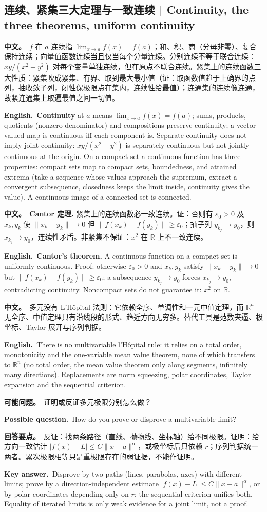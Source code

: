 \documentclass[UTF8,11pt,a4paper]{ctexart}
\newcommand{\R}{\mathbb{R}}
\newcommand{\BOTH}[2]{\par\noindent\textbf{中文。}\ #1\par\noindent\textbf{English.}\ #2\par}
\newcommand{\ASK}[4]{\begin{samepage}\par\noindent\textbf{可能问题。}\ #1\par\noindent\textbf{Possible question.}\ #2\par\noindent\textbf{回答要点。}\ #3\par\noindent\textbf{Key answer.}\ #4\medskip\end{samepage}}
\begin{document}
\subsection{连续、紧集三大定理与一致连续 | Continuity, the three theorems, uniform continuity}
\BOTH{$f$ 在 $a$ 连续指 $\lim_{x\to a}f(x)=f(a)$；和、积、商（分母非零）、复合保持连续；向量值函数连续当且仅当每个分量连续。分别连续不等于联合连续：$xy/(x^2+y^2)$ 对每个变量单独连续，但在原点不联合连续。紧集上的连续函数三大性质：紧集映成紧集、有界、取到最大最小值（证：取函数值趋于上确界的点列，抽收敛子列，闭性保极限点在集内，连续性给最值）；连通集的连续像连通，故紧连通集上取遍最值之间一切值。}{\textbf{Continuity} at $a$ means $\lim_{x\to a}f(x)=f(a)$; sums, products, quotients (nonzero denominator) and compositions preserve continuity; a vector-valued map is continuous iff each component is. Separate continuity does not imply joint continuity: $xy/(x^2+y^2)$ is separately continuous but not jointly continuous at the origin. On a compact set a continuous function has three properties: compact sets map to compact sets, boundedness, and attained extrema (take a sequence whose values approach the supremum, extract a convergent subsequence, closedness keeps the limit inside, continuity gives the value). A continuous image of a connected set is connected.}
\BOTH{\textbf{Cantor 定理.} 紧集上的连续函数必一致连续。证：否则有 $\varepsilon_0>0$ 及 $x_k,y_k$ 使 $\|x_k-y_k\|\to0$ 但 $\|f(x_k)-f(y_k)\|\ge\varepsilon_0$；抽子列 $y_{k_j}\to y_0$，则 $x_{k_j}\to y_0$，连续性矛盾。非紧集不保证：$x^2$ 在 $\R$ 上不一致连续。}{\textbf{Cantor's theorem.} A continuous function on a compact set is uniformly continuous. Proof: otherwise $\varepsilon_0>0$ and $x_k,y_k$ satisfy $\|x_k-y_k\|\to0$ but $\|f(x_k)-f(y_k)\|\ge\varepsilon_0$; a subsequence $y_{k_j}\to y_0$ forces $x_{k_j}\to y_0$, contradicting continuity. Noncompact sets do not guarantee it: $x^2$ on $\R$.}
\BOTH{多元没有 L'H\^opital 法则：它依赖全序、单调性和一元中值定理，而 $\R^n$ 无全序、中值定理只有沿线段的形式、趋近方向无穷多。替代工具是范数夹逼、极坐标、Taylor 展开与序列判据。}{There is no multivariable l'H\^opital rule: it relies on a total order, monotonicity and the one-variable mean value theorem, none of which transfers to $\R^n$ (no total order, the mean value theorem only along segments, infinitely many directions). Replacements are norm squeezing, polar coordinates, Taylor expansion and the sequential criterion.}
\ASK{证明或反证多元极限分别怎么做？}{How do you prove or disprove a multivariable limit?}{反证：找两条路径（直线、抛物线、坐标轴）给不同极限。证明：给方向一致估计 $|f(x)-L|\le C\|x-a\|^\alpha$，或极坐标后只依赖 $r$；序列判据统一两者。累次极限相等只是重极限存在的弱证据，不能作证明。}{Disprove by two paths (lines, parabolas, axes) with different limits; prove by a direction-independent estimate $|f(x)-L|\le C\|x-a\|^\alpha$, or by polar coordinates depending only on $r$; the sequential criterion unifies both. Equality of iterated limits is only weak evidence for a joint limit, not a proof.}
\end{document}
